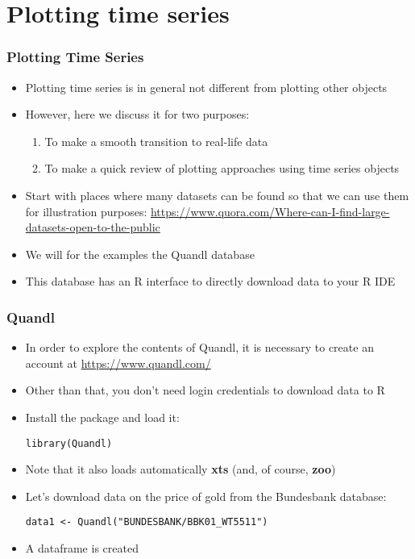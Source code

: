 \documentclass[10pt]{beamer}
\theoremstyle{definition}
\begin{document}
\section{Plotting time series}
\begin{frame}[fragile]
\frametitle{Plotting Time Series}
\begin{itemize}
	\item Plotting time series is in general not different from plotting other objects
	\item However, here we discuss it for two purposes:
	\begin{enumerate}
		\item To make a smooth transition to real-life data
		\item To make a quick review of plotting approaches using time series objects
	\end{enumerate}
	\item Start with places where many datasets can be found so that we can use them for illustration purposes: \url{https://www.quora.com/Where-can-I-find-large-datasets-open-to-the-public}
	\item We will for the examples the Quandl database
	\item This database has an R interface to directly download data to your R IDE
\end{itemize}
\end{frame}

\begin{frame}[fragile]
\frametitle{Quandl}
\begin{itemize}
	\item In order to explore the contents of Quandl, it is necessary to create an account at \url{https://www.quandl.com/}
	\item Other than that, you don't need login credentials to download data to R
	\item Install the package and load it:
	\begin{lstlisting}[style = rstyle, breaklines]
	library(Quandl)
	\end{lstlisting}
	\item Note that it also loads automatically \textbf{xts} (and, of course, \textbf{zoo})
	\item Let's download data on the price of gold from the Bundesbank database:
	\begin{lstlisting}[style = rstyle, breaklines]
	data1 <- Quandl("BUNDESBANK/BBK01_WT5511")
	\end{lstlisting}
	\item A dataframe is created
	\end{itemize}
\end{frame}
\end{document}
